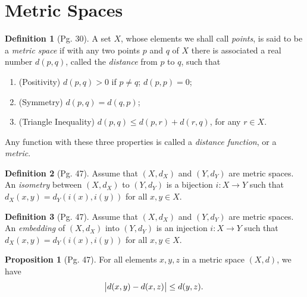\documentclass[leqno]{article}
\theoremstyle{definition}
\newtheorem{prop}{Proposition}[section]
\newtheorem{definition}{Definition}[section]
\theoremstyle{remark}
\begin{document}
        \section{Metric Spaces}
            \begin{definition}[Pg. 30]\label{def:5.1}
                A set $X$, whose elements we shall call \emph{points}, is said to be a \emph{metric space} if with any two points $p$ and $q$ of $X$ there is associated a real number $d(p,q)$, called the \emph{distance} from $p$ to $q$, such that 
                    \begin{enumerate}[label=(\alph*)]
                        \item(Positivity) $d(p,q)>0$ if $p\neq q$; $d(p,p)=0$;
                        \item(Symmetry) $d(p,q)=d(q,p)$;
                        \item(Triangle Inequality) $d(p,q)\leq d(p,r)+d(r,q)$, for any $r\in X$.
                    \end{enumerate}
                Any function with these three properties is called a \emph{distance function}, or a \emph{metric}. \cite{rud}
            \end{definition}
            \begin{definition}[Pg. 47]\label{def:5.2}
                Assume that $(X,d_X)$ and $(Y,d_Y)$ are metric spaces. An \emph{isometry} between $(X,d_X)$ to $(Y,d_Y)$ is a bijection $i\colon X\rightarrow Y$ such that $d_X(x,y)=d_Y(i(x),i(y))$ for all $x,y\in X$. \cite{lin}
            \end{definition}
            \begin{definition}[Pg. 47]\label{def:5.3}
                Assume that $(X,d_X)$ and $(Y,d_Y)$ are metric spaces. An \emph{embedding} of $(X,d_X)$ into $(Y,d_Y)$ is an injection $i\colon X\rightarrow Y$ such that $d_X(x,y)=d_Y(i(x),i(y))$ for all $x,y\in X$. \cite{lin}
            \end{definition}
            \begin{prop}[Pg. 47]\label{prop:5.1}
                For all elements $x,y,z$ in a metric space $(X,d)$, we have 
                    \begin{equation*}
                        \abs{d(x,y)-d(x,z)}\leq d(y,z).
                    \end{equation*} \cite{lin}
            \end{prop}
\end{document}
